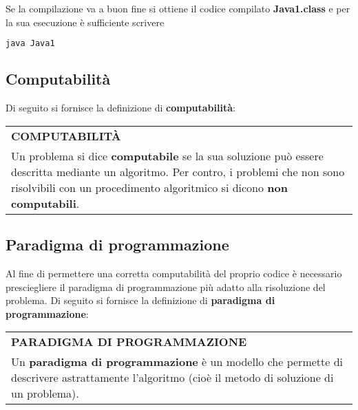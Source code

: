 \documentclass[a4paper]{extarticle}
\renewcommand\arraystretch{}
\begin{document}
\vspace{1em}
\noindent
Se la compilazione va a buon fine si ottiene il codice compilato \textbf{Java1.class} e per la sua esecuzione è sufficiente scrivere

\begin{lstlisting}[language=Java, caption=Esempio di esecuzione in Java]
  java Java1
\end{lstlisting}

\vspace{1em}
\subsection{Computabilità}
Di seguito si fornisce la definizione di \textbf{computabilità}:

\vspace{1em}
\setlength{\tabcolsep}{14pt}
\renewcommand{\arraystretch}{2}
\noindent
\begin{tabularx}{\textwidth}{@{}|P|@{}}
    \hline
    {\textbf{COMPUTABILITÀ}}\\
    \parbox{\linewidth}{Un problema si dice \textbf{computabile} se la sua soluzione può essere descritta mediante un algoritmo. Per contro, i problemi che non sono risolvibili con un procedimento algoritmico si dicono \textbf{non computabili}.\vspace{3mm}}\\
    \hline
\end{tabularx}

\newpage
\noindent
\subsection{Paradigma di programmazione}
Al fine di permettere una corretta computabilità del proprio codice è necessario presciegliere il paradigma di programmazione più adatto alla risoluzione del problema. Di seguito si fornisce la definizione di \textbf{paradigma di programmazione}:

\vspace{1em}
\setlength{\tabcolsep}{14pt}
\renewcommand{\arraystretch}{2}
\noindent
\begin{tabularx}{\textwidth}{@{}|P|@{}}
    \hline
    {\textbf{PARADIGMA DI PROGRAMMAZIONE}}\\
    \parbox{\linewidth}{Un \textbf{paradigma di programmazione} è un modello che permette di descrivere astrattamente l’algoritmo (cioè il metodo di soluzione di un problema).\vspace{3mm}}\\
    \hline
\end{tabularx}
\end{document}
